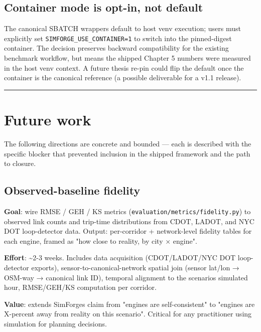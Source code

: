 \subsection{Container mode is opt-in, not
default}\label{647-container-mode-is-opt-in-not-default}

The canonical SBATCH wrappers default to host venv execution; users must
explicitly set \texttt{SIMFORGE\_USE\_CONTAINER=1} to switch into the
pinned-digest container. The decision preserves backward compatibility
for the existing benchmark workflow, but means the shipped Chapter 5
numbers were measured in the host venv context. A future thesis re-pin
could flip the default once the container is the canonical reference (a
possible deliverable for a v1.1 release).

\begin{center}\rule{0.5\linewidth}{0.5pt}\end{center}

\section{Future work}\label{65-future-work}

The following directions are concrete and bounded --- each is described
with the specific blocker that prevented inclusion in the shipped
framework and the path to closure.

\subsection{Observed-baseline
fidelity}\label{651-observed-baseline-fidelity}

\textbf{Goal}: wire RMSE / GEH / KS metrics
(\texttt{evaluation/metrics/fidelity.py}) to observed link counts and
trip-time distributions from CDOT, LADOT, and NYC DOT loop-detector
data. Output: per-corridor + network-level fidelity tables for each
engine, framed as "how close to reality, by city × engine".

\textbf{Effort}: \textasciitilde2-3 weeks. Includes data acquisition
(CDOT/LADOT/NYC DOT loop-detector exports), sensor-to-canonical-network
spatial join (sensor lat/lon → OSM-way → canonical link ID), temporal
alignment to the scenario\textquotesingle s simulated hour, RMSE/GEH/KS
computation per corridor.

\textbf{Value}: extends SimForge\textquotesingle s claim from "engines
are self-consistent" to "engines are X-percent away from reality on this
scenario". Critical for any practitioner using simulation for planning
decisions.


